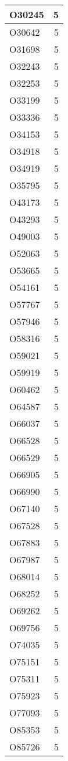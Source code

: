 \documentclass[
]{book}
\theoremstyle{definition}
\theoremstyle{definition}
\theoremstyle{definition}
\theoremstyle{definition}
\theoremstyle{remark}
\begin{document}
\begin{table}
\begin{tabular}{l|r}
\hline
O30245 & 5\\
\hline
O30642 & 5\\
\hline
O31698 & 5\\
\hline
O32243 & 5\\
\hline
O32253 & 5\\
\hline
O33199 & 5\\
\hline
O33336 & 5\\
\hline
O34153 & 5\\
\hline
O34918 & 5\\
\hline
O34919 & 5\\
\hline
O35795 & 5\\
\hline
O43173 & 5\\
\hline
O43293 & 5\\
\hline
O49003 & 5\\
\hline
O52063 & 5\\
\hline
O53665 & 5\\
\hline
O54161 & 5\\
\hline
O57767 & 5\\
\hline
O57946 & 5\\
\hline
O58316 & 5\\
\hline
O59021 & 5\\
\hline
O59919 & 5\\
\hline
O60462 & 5\\
\hline
O64587 & 5\\
\hline
O66037 & 5\\
\hline
O66528 & 5\\
\hline
O66529 & 5\\
\hline
O66905 & 5\\
\hline
O66990 & 5\\
\hline
O67140 & 5\\
\hline
O67528 & 5\\
\hline
O67883 & 5\\
\hline
O67987 & 5\\
\hline
O68014 & 5\\
\hline
O68252 & 5\\
\hline
O69262 & 5\\
\hline
O69756 & 5\\
\hline
O74035 & 5\\
\hline
O75151 & 5\\
\hline
O75311 & 5\\
\hline
O75923 & 5\\
\hline
O77093 & 5\\
\hline
O85353 & 5\\
\hline
O85726 & 5\\

\end{tabular}
\end{table}
\end{document}
